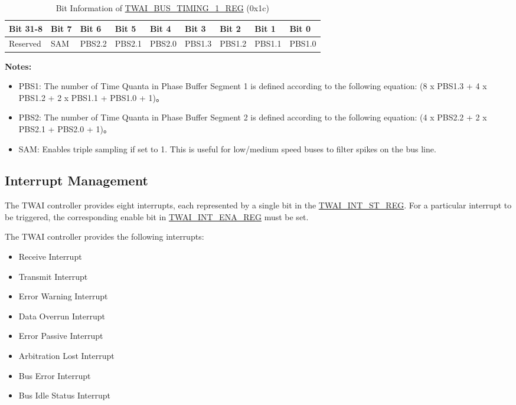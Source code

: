 \documentclass[main\_\_EN.tex]{subfiles}
\begin{document}
\begin{longtable}[c]{|p{1.4cm}|p{1.4cm}|p{1.4cm}|p{1.4cm}|p{1.4cm}|p{1.4cm}|p{1.4cm}|p{1.4cm}|p{1.4cm}|}
    \caption{Bit Information of \hyperref[regdesc:TWAIBUSTIMING1REG]{TWAI\_BUS\_TIMING\_1\_REG} (0x1c)}
    \label{tab:twai-bit-info-bus-timing-1-reg}\\
    \hline
       \rowcolor{lightgray}
   \textbf{Bit 31-8} & \textbf{Bit 7} & \textbf{Bit 6} & \textbf{Bit 5} & \textbf{Bit 4} & \textbf{Bit 3} & \textbf{Bit 2} & \textbf{Bit 1} & \textbf{Bit 0}\\\hline 
   Reserved & SAM & PBS2.2 & PBS2.1 & PBS2.0 & PBS1.3 &PBS1.2 & PBS1.1 & PBS1.0\\
    \hline
\end{longtable}
\vspace{-1.5em}
{\bfseries Notes:}\\
\begin{itemize}
    \item PBS1: The number of Time Quanta in Phase Buffer Segment 1 is defined according to the following equation: (8 x PBS1.3 + 4 x PBS1.2 + 2 x PBS1.1 + PBS1.0 + 1)。
    \item PBS2: The number of Time Quanta in Phase Buffer Segment 2 is defined according to the following equation: (4 x PBS2.2 + 2 x PBS2.1 + PBS2.0 + 1)。
    \item SAM: Enables triple sampling if set to 1. This is useful for low/medium speed buses to filter spikes on the bus line.
\end{itemize}

\subsection{Interrupt Management}
\label{sec:twai-interrupt-management}
The \chipname{} TWAI controller provides eight interrupts, each represented by a single bit in the \hyperref[regdesc:TWAIINTSTREG]{TWAI\_INT\_ST\_REG}. For a particular interrupt to be triggered, the corresponding enable bit in \hyperref[regdesc:TWAIINTENAREG]{TWAI\_INT\_ENA\_REG} must be set.

The TWAI controller provides the following interrupts:

\begin{itemize}
    \item Receive Interrupt
    \item Transmit Interrupt
    \item Error Warning Interrupt
    \item Data Overrun Interrupt
    \item Error Passive Interrupt
    \item Arbitration Lost Interrupt
    \item Bus Error Interrupt
    \item Bus Idle Status Interrupt
\end{itemize}
\end{document}
